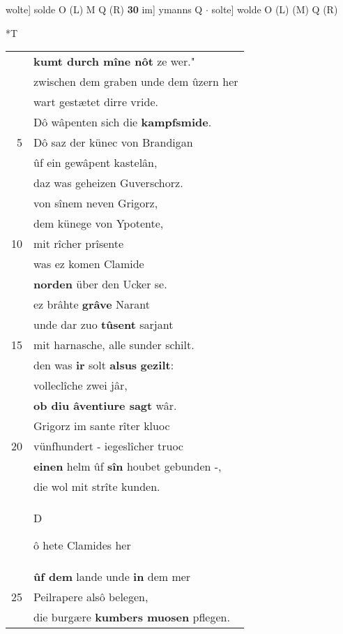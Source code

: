 \documentclass[8pt,a4paper,notitlepage]{article}
\begin{document}
\begin{table}[ht]
\begin{minipage}[t]{0.5\linewidth}
wolte] solde O (L) M Q (R) \textbf{30} im] ymanns Q  $\cdot$ solte] wolde O (L) (M) Q (R) \newline
\end{minipage}
\hspace{0.5cm}
\begin{minipage}[t]{0.5\linewidth}
\small
\begin{center}*T
\end{center}
\begin{tabular}{rl}
 & \textbf{kumt durch mîne nôt} ze wer."\\ 
 & zwischen dem graben unde dem ûzern her\\ 
 & wart gestætet dirre vride.\\ 
 & Dô wâpenten sich die \textbf{kampfsmide}.\\ 
5 & Dô saz der künec von Brandigan\\ 
 & ûf ein gewâpent kastelân,\\ 
 & daz was geheizen Guverschorz.\\ 
 & von sînem neven Grigorz,\\ 
 & dem künege von Ypotente,\\ 
10 & mit rîcher prîsente\\ 
 & was ez komen Clamide\\ 
 & \textbf{norden} über den Ucker se.\\ 
 & ez brâhte \textbf{grâve} Narant\\ 
 & unde dar zuo \textbf{tûsent} sarjant\\ 
15 & mit harnasche, alle sunder schilt.\\ 
 & den was \textbf{ir} solt \textbf{alsus} \textbf{gezilt}:\\ 
 & volleclîche zwei jâr,\\ 
 & \textbf{ob diu âventiure sagt} wâr.\\ 
 & Grigorz im sante rîter kluoc\\ 
20 & vünfhundert - iegeslîcher truoc\\ 
 & \textbf{einen} helm ûf \textbf{sîn} houbet gebunden -,\\ 
 & die wol mit strîte kunden.\\ 
 & \begin{large}D\end{large}ô hete Clamides her\\ 
 & \textbf{ûf dem} lande unde \textbf{in} dem mer\\ 
25 & Peilrapere alsô belegen,\\ 
 & die burgære \textbf{kumbers muosen} pflegen.\\ 

\end{tabular}
\end{minipage}
\end{table}
\end{document}
